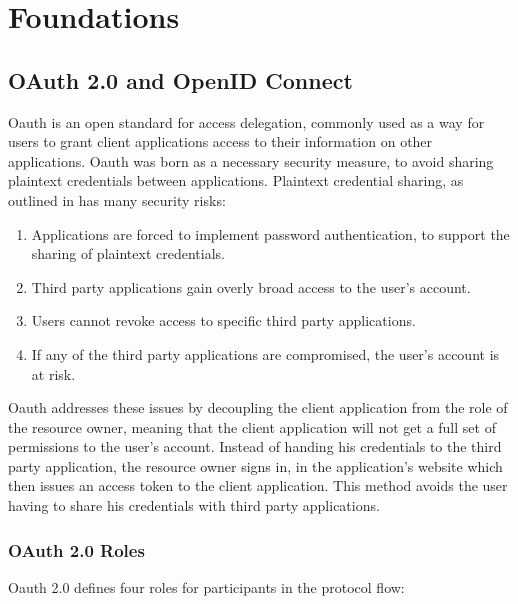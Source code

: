 \chapter{Foundations}
\label{cha:relatedwork}

\section{OAuth 2.0 and OpenID Connect}
\label{cha:relatedwork:oauth}

Oauth is an open standard for access delegation,
commonly used as a way for users to grant client applications access to their information on other applications.
Oauth was born as a necessary security measure, to avoid sharing plaintext credentials between applications.
Plaintext credential sharing, as outlined in \cite{rfcOauth2} has many security risks:

\begin{enumerate}
	\item Applications are forced to implement password authentication, to support the sharing of plaintext credentials.
	\item Third party applications gain overly broad access to the user's account.
	\item Users cannot revoke access to specific third party applications.
	\item If any of the third party applications are compromised, the user's account is at risk.
\end{enumerate}

Oauth addresses these issues by decoupling the client application from the role of the resource owner,
meaning that the client application will not get a full set of permissions to the user's account.
Instead of handing his credentials to the third party application,
the resource owner signs in, in the application's website which then issues an access token to the client application.
This method avoids the user having to share his credentials with third party applications.

\subsection{OAuth 2.0 Roles}

Oauth 2.0 defines four roles for participants in the protocol flow:

